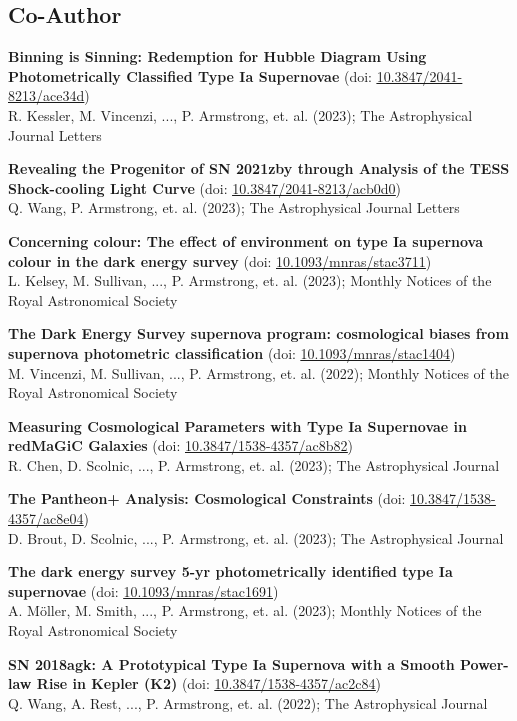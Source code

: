 \documentclass[letterpaper,11pt]{article}
\newcommand*\lbreak{\\[\baselineskip]}
\newcommand{\publicationElement}[5]{%
    \textbf{{#1}} ({#4})\\{#3}; {#2}\lbreak{}
}
\begin{document}
    \subsection{Co-Author}

        \publicationElement{Binning is Sinning: Redemption for Hubble Diagram Using Photometrically Classified Type Ia Supernovae}{The Astrophysical Journal Letters}{R. Kessler, M. Vincenzi, ..., P. Armstrong, et. al. (2023)}{doi: \href{https://doi.org/10.3847/2041-8213/ace34d}{\underline{10.3847/2041-8213/ace34d}}}{}
        \publicationElement{Revealing the Progenitor of SN 2021zby through Analysis of the TESS Shock-cooling Light Curve}{The Astrophysical Journal Letters}{Q. Wang, P. Armstrong, et. al. (2023)}{doi: \href{https://doi.org/10.3847/2041-8213/acb0d0}{\underline{10.3847/2041-8213/acb0d0}}}{}
        \publicationElement{Concerning colour: The effect of environment on type Ia supernova colour in the dark energy survey}{Monthly Notices of the Royal Astronomical Society}{L. Kelsey, M. Sullivan, ..., P. Armstrong, et. al. (2023)}{doi: \href{https://doi.org/10.1093/mnras/stac3711}{\underline{10.1093/mnras/stac3711}}}{}
        \publicationElement{The Dark Energy Survey supernova program: cosmological biases from supernova photometric classification}{Monthly Notices of the Royal Astronomical Society}{M. Vincenzi, M. Sullivan, ..., P. Armstrong, et. al. (2022)}{doi: \href{https://doi.org/10.1093/mnras/stac1404}{\underline{10.1093/mnras/stac1404}}}{}
        \publicationElement{Measuring Cosmological Parameters with Type Ia Supernovae in redMaGiC Galaxies}{The Astrophysical Journal}{R. Chen, D. Scolnic, ..., P. Armstrong, et. al. (2023)}{doi: \href{https://doi.org/10.3847/1538-4357/ac8b82}{\underline{10.3847/1538-4357/ac8b82}}}{}
        \publicationElement{The Pantheon+ Analysis: Cosmological Constraints}{The Astrophysical Journal}{D. Brout, D. Scolnic, ..., P. Armstrong, et. al. (2023)}{doi: \href{https://doi.org/10.3847/1538-4357/ac8e04}{\underline{10.3847/1538-4357/ac8e04}}}{}
        \publicationElement{The dark energy survey 5-yr photometrically identified type Ia supernovae}{Monthly Notices of the Royal Astronomical Society}{A. Möller, M. Smith, ..., P. Armstrong, et. al. (2023)}{doi: \href{https://doi.org/10.1093/mnras/stac1691}{\underline{10.1093/mnras/stac1691}}}{}
        \publicationElement{SN 2018agk: A Prototypical Type Ia Supernova with a Smooth Power-law Rise in Kepler (K2)}{The Astrophysical Journal}{Q. Wang, A. Rest, ..., P. Armstrong, et. al. (2022)}{doi: \href{https://doi.org/10.3847/1538-4357/ac2c84}{\underline{10.3847/1538-4357/ac2c84}}}{}
\end{document}
